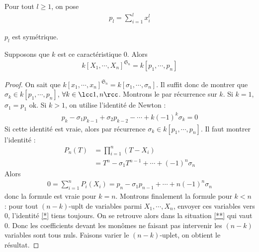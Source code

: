         \begin{defi}
            Pour tout $l \geq 1$, on pose
            \begin{align*}
                p_l = \sum_{i = 1}^l x_i^l
            \end{align*}
        \end{defi}
        \begin{remq}
            $p_l$ est symétrique.
        \end{remq}
        \begin{theo}
            Supposons que $k$ est ce caractéristique $0$. Alors
            \begin{align*}
                k[X_1, \cdots, X_n]^{\mathfrak{S}_n} = k[p_1, \cdots, p_n]
            \end{align*} 
        \end{theo}
        \begin{proof}
            On sait que $k[x_1, \cdots, x_n]^{\mathfrak{S}_n} = k[\sigma_1, \cdots, \sigma_n]$. Il suffit donc de montrer que $\sigma_k \in k[p_1, \cdots, p_n]$, $\forall k \in \lcc 1,n \rcc$. Montrons le par récurrence sur $k$. Si $k = 1$, $\sigma_1 = p_1$ ok. Si $k > 1$, on utilise l'identité de Newton :
            \begin{align}
                \label{*}
                p_k - \sigma_1p_{k - 1} + \sigma_2p_{k - 2} - \cdots + k(-1)^k\sigma_k = 0
            \end{align}
            Si cette identité est vraie, alors par récurrence $\sigma_k \in k[p_1, \cdots, p_n]$. Il faut montrer l'identité :
            \begin{align*}
                P_n(T) &= \prod_{i = 1} ^n (T - X_i) \\
                &= T^n - \sigma_1T^{n-1} + \cdots + (-1)^n\sigma_n
            \end{align*}
            Alors
            \begin{align}
                \label{**}
                0 = \sum_{i = 1}^n P_i(X_i) = p_n - \sigma_1p_{n-1} + \cdots + n(-1)^n\sigma_n
            \end{align}
            donc la formule est vraie pour $k = n$. Montrons finalement la formule pour $k < n$ : pour tout $(n - k)$-uplt de variables parmi $X_1, \cdots, X_n$, envoyer ces variables vers $0$, l'identité \ref{*} tiens toujours. On se retrouve alors dans la situation \ref{**} qui vaut $0$. Donc les coefficients devant les monômes ne faisant pas intervenir les $(n - k)$ variables sont tous nuls. Faisons varier le $(n - k)$-uplet, on obtient le résultat.
        \end{proof}

